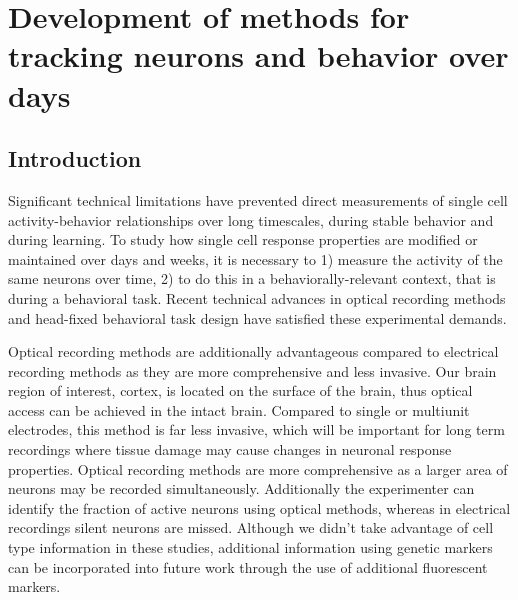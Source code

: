 \chapter{Development of methods for tracking neurons and behavior over days}

\section{Introduction}
Significant technical limitations have prevented direct measurements of single cell activity-behavior relationships over long timescales, during stable behavior and during learning. To study how single cell response properties are modified or maintained over days and weeks, it is necessary to 1) measure the activity of the same neurons over time, 2) to do this in a behaviorally-relevant context, that is during a behavioral task. Recent technical advances in optical recording methods and head-fixed behavioral task design have satisfied these experimental demands.

\bigskip

Optical recording methods are additionally advantageous compared to electrical recording methods as they are more comprehensive and less invasive. Our brain region of interest, cortex, is located on the surface of the brain, thus optical access can be achieved in the intact brain. Compared to single or multiunit electrodes, this method is far less invasive, which will be important for long term recordings where tissue damage may cause changes in neuronal response properties. Optical recording methods are more comprehensive as a larger area of neurons may be recorded simultaneously. Additionally the experimenter can identify the fraction of active neurons using optical methods, whereas in electrical recordings silent neurons are missed. Although we didn't take advantage of cell type information in these studies, additional information using genetic markers can be incorporated into future work through the use of additional fluorescent markers.

